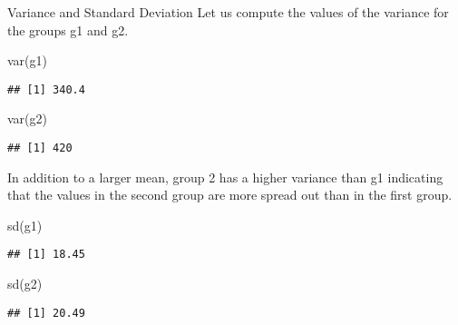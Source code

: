 \documentclass[
  ignorenonframetext,
]{beamer}
\newenvironment{Shaded}{\begin{snugshade}}{\end{snugshade}}
\newcommand{\FunctionTok}[1]{\textcolor[rgb]{0.00,0.00,0.00}{#1}}
\newcommand{\NormalTok}[1]{#1}
\begin{document}
\begin{frame}[fragile]{Variance and Standard Deviation}
\protect\hypertarget{variance-and-standard-deviation}{}
Let us compute the values of the variance for the groups g1 and g2.

\begin{Shaded}
\begin{Highlighting}[]
\FunctionTok{var}\NormalTok{(g1)}
\end{Highlighting}
\end{Shaded}

\begin{verbatim}
## [1] 340.4
\end{verbatim}

\begin{Shaded}
\begin{Highlighting}[]
\FunctionTok{var}\NormalTok{(g2)}
\end{Highlighting}
\end{Shaded}

\begin{verbatim}
## [1] 420
\end{verbatim}

In addition to a larger mean, group 2 has a higher variance than g1
indicating that the values in the second group are more spread out than
in the first group.
\end{frame}

\begin{frame}[fragile]
\begin{Shaded}
\begin{Highlighting}[]
\FunctionTok{sd}\NormalTok{(g1)}
\end{Highlighting}
\end{Shaded}

\begin{verbatim}
## [1] 18.45
\end{verbatim}

\begin{Shaded}
\begin{Highlighting}[]
\FunctionTok{sd}\NormalTok{(g2)}
\end{Highlighting}
\end{Shaded}

\begin{verbatim}
## [1] 20.49
\end{verbatim}
\end{frame}
\end{document}
